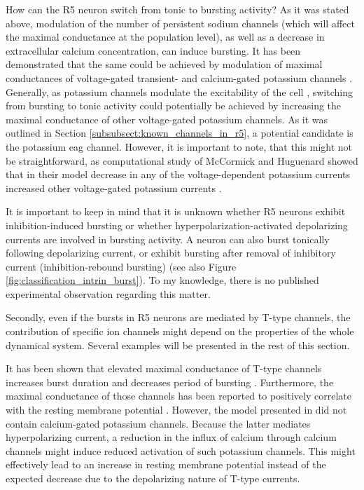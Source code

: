 \documentclass[../main.tex]{subfiles}
\begin{document}
\vspace*{0.5cm}

How can the R5 neuron switch from tonic to bursting activity? As it was stated above, modulation of the number of persistent sodium channels (which will affect the maximal conductance at the population level), as well as a decrease in extracellular calcium concentration, can induce bursting. It has been demonstrated that the same could be achieved by modulation of maximal conductances of voltage-gated transient- and calcium-gated potassium channels \parencite{franciRobustTunableBursting2018}. Generally, as potassium channels modulate the excitability of the cell \parencite{bruggemannEtheragogoEncodesVoltagegated1993}, switching from bursting to tonic activity could potentially be achieved by increasing the maximal conductance of other voltage-gated potassium channels. As it was outlined in Section \ref{subsubsect:known_channels_in_r5}, a potential candidate is the potassium \gls{eag} channel. However, it is important to note,
that this might not be straightforward, as computational study of McCormick and Huguenard showed that in their model decrease in any of the voltage-dependent potassium currents increased other voltage-gated potassium currents \parencite{mccormickModelElectrophysiologicalProperties1992}.

\vspace*{0.5cm}

It is important to keep in mind that it is unknown whether R5 neurons exhibit inhibition-induced bursting or whether hyperpolarization-activated depolarizing currents are involved in bursting activity. A neuron can also burst tonically following depolarizing current, or exhibit bursting after removal of inhibitory current (inhibition-rebound bursting) \parencite{izhikevichDynamicalSystemsNeuroscience2006} (see also Figure \ref{fig:classification_intrin_burst}).
To my knowledge, there is no published experimental observation regarding this matter.

Secondly, even if the bursts in R5 neurons are mediated by T-type channels, the contribution of specific ion channels might depend on the properties of the whole dynamical system. Several examples will be presented in the rest of this section.

It has been shown that elevated maximal conductance of T-type channels increases burst duration and decreases period of bursting \parencite{parkMathematicalModelSubthalamic2021}. Furthermore, the maximal conductance of those channels has been reported to positively correlate with the resting membrane potential \parencite{amarilloInterplaySevenSubthreshold2014}. However, the model presented in \parencite{amarilloInterplaySevenSubthreshold2014} did not contain calcium-gated potassium channels. Because the latter mediates hyperpolarizing current, a reduction in the influx of calcium through calcium channels might induce reduced activation of such potassium channels. This might effectively lead to an increase in resting membrane potential instead of the expected decrease due to the depolarizing nature of T-type currents.
\end{document}
